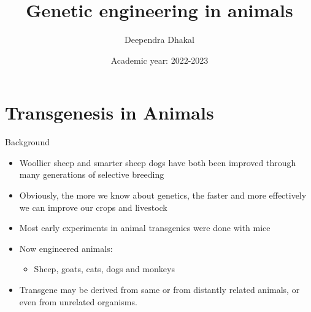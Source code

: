 \documentclass[
  ignorenonframetext,
  aspectratio=169]{beamer}
\title{Genetic engineering in animals}
\author{Deependra Dhakal}
\date{Academic year: 2022-2023}
\institute{CNRM, Tikapur \and Agriculture and Forestry University}
\providecommand{\tightlist}{%
  \setlength{\itemsep}{0pt}\setlength{\parskip}{0pt}}
\begin{document}
\frame{\titlepage}

\begin{frame}[allowframebreaks]
  \tableofcontents[hideallsubsections]
\end{frame}
\hypertarget{transgenesis-in-animals}{%
\section{Transgenesis in Animals}\label{transgenesis-in-animals}}

\begin{frame}{Background}
\protect\hypertarget{background}{}
\begin{itemize}
\tightlist
\item
  Woollier sheep and smarter sheep dogs have both been improved through
  many generations of selective breeding
\item
  Obviously, the more we know about genetics, the faster and more
  effectively we can improve our crops and livestock
\item
  Most early experiments in animal transgenics were done with mice
\item
  Now engineered animals:

  \begin{itemize}
  \tightlist
  \item
    Sheep, goats, cats, dogs and monkeys
  \end{itemize}
\item
  Transgene may be derived from same or from distantly related animals,
  or even from unrelated organisms.
\end{itemize}
\end{frame}
\end{document}
